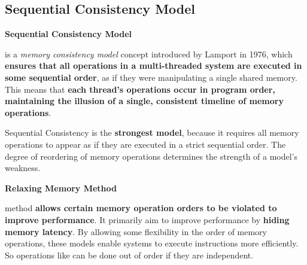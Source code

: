 \subsection{Sequential Consistency Model}

\begin{flushleft}
    \textcolor{Green3}{ \textbf{Sequential Consistency Model}}
\end{flushleft}
 is a \emph{memory consistency model} concept introduced by Lamport in 1976, which \textbf{ensures that all operations in a multi-threaded system are executed in some sequential order}, as if they were manipulating a single shared memory. This means that \textbf{each thread's operations occur in program order, maintaining the illusion of a single, consistent timeline of memory operations}.

\highspace
Sequential Consistency is the \textbf{strongest model}, because it requires all memory operations to appear as if they are executed in a strict sequential order. The degree of reordering of memory operations determines the strength of a model's weakness.

\highspace
\begin{flushleft}
    \textcolor{Green3}{ \textbf{Relaxing Memory Method}}
\end{flushleft}
 method \textbf{allows certain memory operation orders to be violated to improve performance}. It primarily aim to improve performance by \textbf{hiding memory latency}. By allowing some flexibility in the order of memory operations, these models enable systems to execute instructions more efficiently. So operations like  can be done out of order if they are independent.

